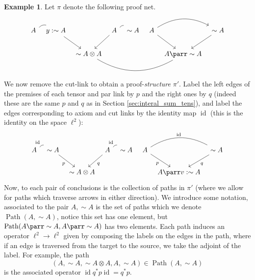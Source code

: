 \documentclass[12pt]{article}
\theoremstyle{plain}
\theoremstyle{definition}
\newtheorem{example}[thm]{Example}
\newcommand{\lto}{\longrightarrow}
\newcommand{\negation}{\sim}
\begin{document}
	\begin{example}
		Let $\pi$ denote the following proof net.
		\begin{equation}\label{eq:standard_example}
			\begin{tikzcd}[column sep = tiny]
				{A}\arrow[r,bend left, dash] & {y: \negation A}\arrow[dr] & & {A}\arrow[dl]\arrow[r,bend left, dash] & {\negation A} & {A}\arrow[rr,bend left]\arrow[dr] & & {\negation A}\arrow[dl]\\
				& & {\negation A \otimes A}\arrow[rrrr, bend right, dash] & & & & {A \parr \negation A}
			\end{tikzcd}
		\end{equation}
		We now remove the cut-link to obtain a proof-\emph{structure} $\pi'$. Label the left edges of the premises of each tensor and par link by $p$ and the right ones by $q$ (indeed these are the same $p$ and $q$ as in Section \ref{sec:interal_sum_tens}), and label the edges corresponding to axiom and cut links by the identity map $\operatorname{id}$ (this is the identity on the space $\ell^2$):
		\begin{equation}
			\begin{tikzcd}[column sep = tiny]
				{A}\arrow[r,bend left, dash, "{\operatorname{id}}"] & {\negation A}\arrow[dr,swap, "p"] & & {A}\arrow[dl,"q"]\arrow[r,bend left,dash, "{\operatorname{id}}"] & {\negation A} & {A}\arrow[rr,bend left,dash, "{\operatorname{id}}"]\arrow[dr,swap,"p"] & & {\negation A}\arrow[dl,"q"]\\
				& & {\negation A \otimes A} & & & & {A \parr v: \negation A}
			\end{tikzcd}
		\end{equation}
		Now, to each pair of conclusions is the collection of paths in $\pi'$ (where we allow for paths which traverse arrows in either direction). We introduce some notation, associated to the pair $A, \negation A$ is the set of paths which we denote $\operatorname{Path}(A,\negation A)$, notice this set has one element, but $\operatorname{Path}(A \parr \negation A,A \parr \negation A)$ has two elements. Each path induces an operator $\ell^2 \lto \ell^2$ given by composing the labels on the edges in the path, where if an edge is traversed from the target to the source, we take the adjoint of the label. For example, the path
		\begin{equation}
			(A, \negation A, \negation A \otimes A, A, \negation A) \in \operatorname{Path}(A, \negation A)
		\end{equation}
		is the associated operator $\operatorname{id}q^\ast p\operatorname{id} = q^\ast p$. 

\end{example}
\end{document}
